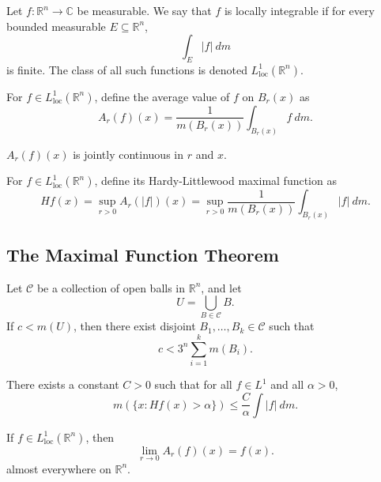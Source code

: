 \documentclass[11pt]{article}
\newcommand{\C}{\mathbb{C}}
\newcommand{\R}{\mathbb{R}}
\newcommand{\Lloc}{L^1_\text{loc}}
\theoremstyle{definition}
\theoremstyle{remark}
\begin{document}
    \begin{definition}
        Let $f\colon \R^n \to \C$ be measurable. We say that $f$ is locally
        integrable if for every bounded measurable $E \subseteq \R^n$, \[
            \int_E |f|\:dm
        \] is finite. The class of all such functions is denoted
        $\Lloc(\R^n)$.
    \end{definition}

    \begin{definition}
        For $f \in \Lloc(\R^n)$, define the average value of $f$ on $B_r(x)$ as \[
            A_r(f)(x) = \frac{1}{m(B_r(x))} \int_{B_r(x)} f\:dm.
        \]
    \end{definition}

    \begin{lemma}
        $A_r(f)(x)$ is jointly continuous in $r$ and $x$.
    \end{lemma}

    \begin{definition}
        For $f \in \Lloc(\R^n)$, define its Hardy-Littlewood maximal function as \[
            Hf(x) = \sup_{r > 0} A_r(|f|)(x) = \sup_{r > 0} \frac{1}{m(B_r(x))}
            \int_{B_r(x)} |f|\:dm.
        \]
    \end{definition}


    \subsection{The Maximal Function Theorem}

    \begin{lemma}
        Let $\mathscr{C}$ be a collection of open balls in $\R^n$, and let \[
            U = \bigcup_{B \in \mathscr{C}} B.
        \] If $c < m(U)$, then there exist disjoint $B_1, \dots, B_k \in \mathscr{C}$
        such that \[
            c < 3^n \sum_{i = 1}^k m(B_i).
        \]
    \end{lemma}

    \begin{theorem}
        There exists a constant $C > 0$ such that for all $f \in L^1$ and all $\alpha
        > 0$, \[
            m(\{x : Hf(x) > \alpha\}) \leq \frac{C}{\alpha} \int |f| \:dm.
        \]
    \end{theorem}

    \begin{theorem}
        If $f \in \Lloc(\R^n)$, then \[
            \lim_{r \to 0} A_r(f)(x) = f(x).
        \] almost everywhere on $\R^n$.
    \end{theorem}
\end{document}
